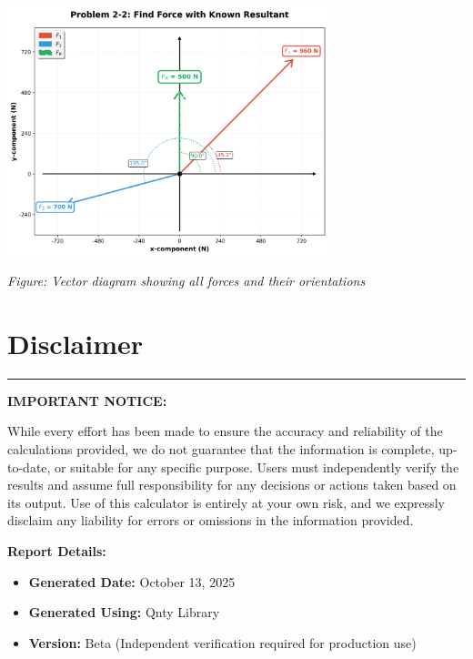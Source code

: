 \documentclass[11pt,a4paper]{article}
\begin{document}
\begin{center}
\includegraphics[width=0.7\textwidth]{Problem_2-2_Find_Force_with_Known_Resultant_diagram.png}
\end{center}

\begin{center}
\textit{Figure: Vector diagram showing all forces and their orientations}
\end{center}


\clearpage

\section*{Disclaimer}

\begin{center}
\rule{\textwidth}{0.4pt}
\end{center}

\noindent\textbf{IMPORTANT NOTICE:}

\noindent While every effort has been made to ensure the accuracy and reliability of the calculations provided, we do not guarantee that the information is complete, up-to-date, or suitable for any specific purpose. Users must independently verify the results and assume full responsibility for any decisions or actions taken based on its output. Use of this calculator is entirely at your own risk, and we expressly disclaim any liability for errors or omissions in the information provided.

\vspace{1em}

\noindent\textbf{Report Details:}
\begin{itemize}
\item \textbf{Generated Date:} October 13, 2025
\item \textbf{Generated Using:} Qnty Library
\item \textbf{Version:} Beta (Independent verification required for production use)
\end{itemize}
\end{document}
